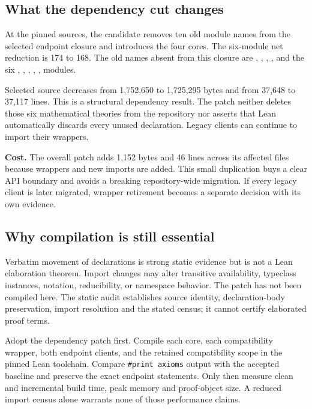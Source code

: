 \subsection{What the dependency cut changes}
At the pinned sources, the candidate removes ten old module names from the selected endpoint closure and introduces the four cores. The six-module net reduction is 174 to 168. The old names absent from this closure are , , , , and the six , , , , ,  modules.

Selected source decreases from 1,752,650 to 1,725,295 bytes and from 37,648 to 37,117 lines. This is a structural dependency result. The patch neither deletes those six mathematical theories from the repository nor asserts that Lean automatically discards every unused declaration. Legacy clients can continue to import their wrappers.

\textbf{Cost.} The overall patch adds 1,152 bytes and 46 lines across its affected files because wrappers and new imports are added. This small duplication buys a clear API boundary and avoids a breaking repository-wide migration. If every legacy client is later migrated, wrapper retirement becomes a separate decision with its own evidence.

\subsection{Why compilation is still essential}
Verbatim movement of declarations is strong static evidence but is not a Lean elaboration theorem. Import changes may alter transitive availability, typeclass instances, notation, reducibility, or namespace behavior. The patch has not been compiled here. The static audit establishes source identity, declaration-body preservation, import resolution and the stated census; it cannot certify elaborated proof terms.

Adopt the dependency patch first. Compile each core, each compatibility wrapper, both endpoint clients, and the retained compatibility scope in the pinned Lean toolchain. Compare \texttt{\#print axioms} output with the accepted baseline and preserve the exact endpoint statements. Only then measure clean and incremental build time, peak memory and proof-object size. A reduced import census alone warrants none of those performance claims.
